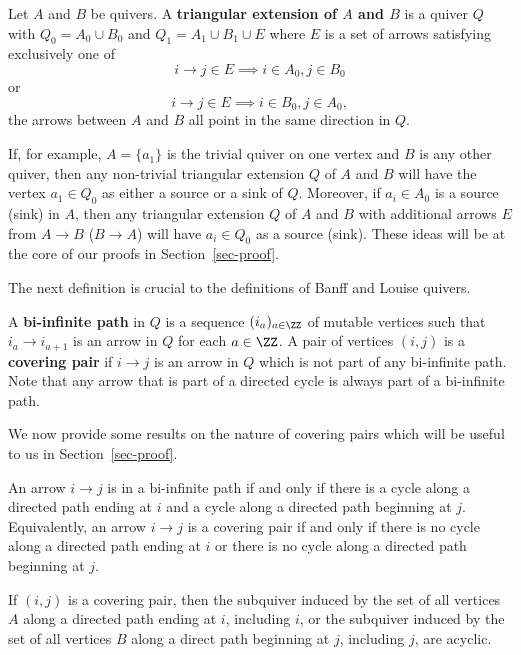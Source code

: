 \begin{defi}\label{def-triangular-extension}
    Let $A$ and $B$ be quivers. 
    A \textbf{triangular extension of $A$ and $B$} is a quiver $Q$ with $Q_0 = A_0 \cup B_0$ and $Q_1 = A_1 \cup B_1 \cup E$ where $E$ is a set of arrows satisfying exclusively one of
    $$i \to j \in E \implies i \in A_0, j \in B_0$$
    or 
    $$i \to j \in E \implies i \in B_0, j \in A_0,$$
    \ie the arrows between $A$ and $B$ all point in the same direction in $Q$.
\end{defi}

If, for example, $A = \{a_1\}$ is the trivial quiver on one vertex and $B$ is any other quiver, then any non-trivial triangular extension $Q$ of $A$ and $B$ will have the vertex $a_1 \in Q_0$ as either a source or a sink of $Q$. 
Moreover, if $a_i \in A_0$ is a source (\resp sink) in $A$, then any triangular extension $Q$ of $A$ and $B$ with additional arrows $E$ from $A \to B$ (\resp $B \to A$) will have $a_i \in Q_0$ as a source (\resp sink).
These ideas will be at the core of our proofs in Section~\ref{sec-proof}.

The next definition is crucial to the definitions of Banff and Louise quivers.

\begin{defi}\label{def-biinfitnite}
    A \textbf{bi-infinite path} in $Q$ is a sequence $(i_a)_{a \in \ZZ}$ of mutable vertices such that $i_a \to i_{a+1}$ is an arrow in $Q$ for each $a \in \ZZ$. 
    A pair of vertices $(i,j)$ is a \textbf{covering pair} if $i \to j$ is an arrow in $Q$ which is not part of any bi-infinite path.
    Note that any arrow that is part of a directed cycle is always part of a bi-infinite path.
 \end{defi}

 We now provide some results on the nature of covering pairs which will be useful to us in Section~\ref{sec-proof}.

\begin{prop}{\cite[Proposition 5.1]{MR2995670}} \label{prop-acyclic-covering-pair}
    An arrow $i \to j$ is in a bi-infinite path if and only if there is a cycle along a directed path ending at $i$ and a cycle along a directed path beginning at $j$.
    Equivalently, an arrow $i \to j$ is a covering pair if and only if there is no cycle along a directed path ending at $i$ or there is no cycle along a directed path beginning at $j$.
\end{prop}

\begin{coro} \label{cor-acyclic-covering-pair}
    If $(i,j)$ is a covering pair, then the subquiver induced by the set of all vertices $A$ along a directed path ending at $i$, including $i$, or the subquiver induced by the set of all vertices $B$ along a direct path beginning at $j$, including $j$, are acyclic.
\end{coro}

